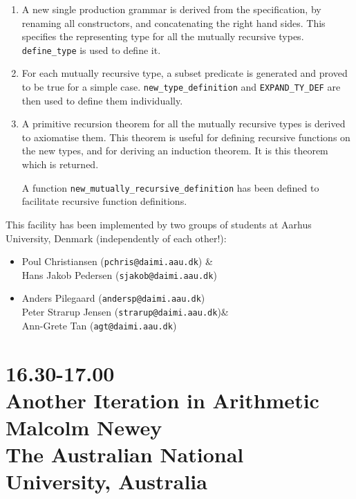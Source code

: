 \begin{enumerate}
\item A new single production grammar is derived from the specification, by
renaming all constructors, and concatenating the right hand sides. This
specifies the representing type for all the mutually recursive types.
{\tt define\_type} is used to define it.
\item For each mutually recursive type, a subset predicate
is generated and proved to be true for a simple case.
{\tt new\_type\_definition} and {\tt EXPAND\_TY\_DEF} are then used to
define them individually. 
\item A primitive recursion theorem for all the mutually recursive types
is derived to axiomatise them. This theorem is useful for defining
recursive functions on the new types, and for deriving an induction theorem.
It is this theorem which is returned.

A function {\tt new\_mutually\_recursive\_definition} has been defined to
facilitate recursive function definitions.
\end{enumerate}

 This facility has been implemented by two groups of students at Aarhus
 University, Denmark (independently of each other!):
\begin{itemize}
\item Poul Christiansen ({\tt pchris@daimi.aau.dk}) \&\\
      Hans Jakob Pedersen ({\tt sjakob@daimi.aau.dk})
\item Anders Pilegaard ({\tt andersp@daimi.aau.dk})\\
      Peter Strarup Jensen ({\tt strarup@daimi.aau.dk})\&\\
      Ann-Grete Tan ({\tt agt@daimi.aau.dk})
\end{itemize}

\newpage
\section*{16.30-17.00\\
Another Iteration in Arithmetic\\
Malcolm Newey \\
\large\bf The Australian National University, Australia}

